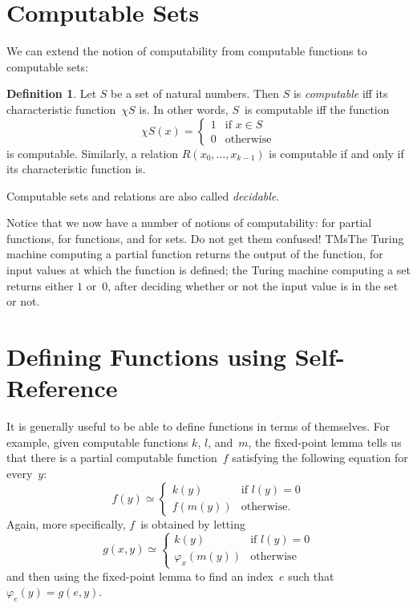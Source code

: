 \documentclass[10pt,a4paper]{article}
\theoremstyle{plain}
\theoremstyle{definition}
\newtheorem{defn}[thm]{Definition}
\theoremstyle{remark}
\newenvironment{explain}{}{}
\newcommand*{\olfileid}[3]{}
\newcommand*{\olsection}[1]{\section*{#1}}
\newcommand*{\olimport}[1]{}
\providecommand{\cfind}[1]{\varphi_{#1}}
\providecommand{\iftag}[1]{#1}
\providecommand{\Char}{\chi}
\begin{document}
\olimport{fixed-point-thm}

\olimport{application-fixed-point}

\olimport{def-functions-self-reference}

\OLEndChapterHook





\olfileid{cmp}{thy}{cps}
\olsection{Computable Sets}

We can extend the notion of computability from computable functions to
computable sets:

\begin{defn}
  Let $S$ be a set of natural numbers. Then $S$ is \emph{computable}
  iff its characteristic function~$\Char{S}$ is. In other words,
  $S$~is computable iff the function
\[
\Char{S}(x) =
\begin{cases}
1 & \text{if $x \in S$} \\
0 & \text{otherwise}
\end{cases}
\]
is computable. Similarly, a relation $R(x_0, \dots, x_{k-1})$ is
computable if and only if its characteristic function is.

Computable sets and relations are also called \emph{decidable}.
\end{defn}

\begin{explain}
Notice that we now have a number of notions of computability: for
partial functions, for functions, and for sets. Do not get them
confused!{} \iftag{TMs}{The Turing machine computing a partial function
  returns the output of the function, for input values at which the
  function is defined; the Turing machine computing a set returns
  either $1$ or~$0$, after deciding whether or not the input value is in
  the set or not.}{}
\end{explain}





\olfileid{cmp}{thy}{slf}
\olsection{Defining Functions using Self-Reference}

It is generally useful to be able to define functions in terms of
themselves. For example, given computable functions $k$, $l$, and~$m$,
the fixed-point lemma tells us that there is a partial computable
function~$f$ satisfying the following equation for every~$y$:
\[
f(y) \simeq
\begin{cases}
k(y) & \text{if $l(y) = 0$} \\
f(m(y)) & \text{otherwise.}
\end{cases}
\]
Again, more specifically, $f$~is obtained by letting
\[
g(x,y) \simeq
\begin{cases}
k(y) & \text{if $l(y) = 0$} \\
\cfind{x}(m(y)) & \text{otherwise}
\end{cases}
\]
and then using the fixed-point lemma to find an index~$e$ such that
$\cfind{e}(y) = g(e,y)$.
\end{document}
